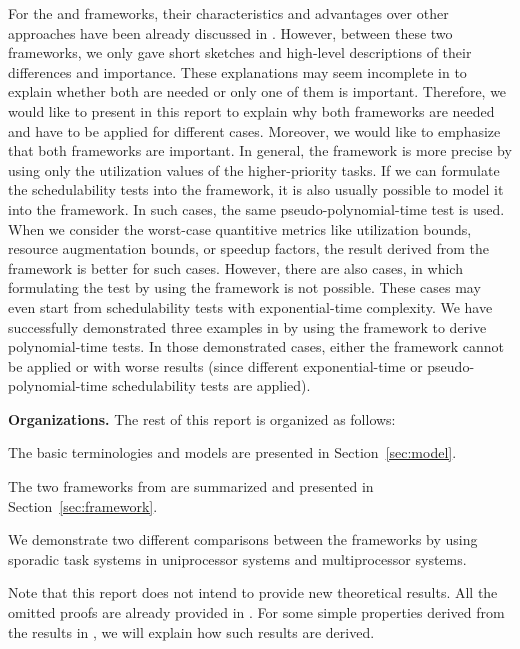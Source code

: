 \documentclass[10pt,conference]{IEEEtran}
\newcommand{\frameworkkq}[1]{}
\newcommand{\frameworkku}[1]{}
\begin{document}
For the \frameworkkq{} and \frameworkku{} frameworks, their
characteristics and advantages over other approaches have been already
discussed in
\cite{DBLP:journals/corr/abs-1501.07084,DBLP:conf/rtss/ChenHL15,DBLP:journals/corr/abs-kRTA,DBLP:conf/rtss/ChenHL16}. However,
between these two frameworks, we only gave short sketches and high-level descriptions of their
differences and importance. These explanations may seem
incomplete in \cite{DBLP:journals/corr/abs-1501.07084,DBLP:conf/rtss/ChenHL15,DBLP:journals/corr/abs-kRTA,DBLP:conf/rtss/ChenHL16} to explain whether both are needed or only one of them is important.  Therefore,
we would like to present in this report to explain why both frameworks
are needed and have to be applied for different cases.  Moreover, we
would like to emphasize that both frameworks are
important. In general, the \frameworkku{}
framework is more precise by using only the utilization values of the
higher-priority tasks. If we can formulate the schedulability tests
into the \frameworkku{} framework, it is also usually possible to
model it into the \frameworkkq{} framework. In such cases, the same
pseudo-polynomial-time test is used. When we consider the worst-case
quantitive metrics like utilization bounds, resource augmentation
bounds, or speedup factors, the result derived from the \frameworkku{}
framework is better for such cases. However, there are also cases, in
which formulating the test by using the \frameworkku{} framework is
not possible. These cases may even start from schedulability tests
with exponential-time complexity. We have successfully demonstrated
three examples in \cite{DBLP:journals/corr/abs-kRTA} by using the
\frameworkkq{} framework to derive polynomial-time tests. In those demonstrated cases, either
the \frameworkku{} framework cannot be applied or with worse results
(since different exponential-time or pseudo-polynomial-time schedulability tests are applied).

\noindent\textbf{Organizations.} The rest of this report is organized
as follows:
\begin{compactitem}
\item The basic terminologies and models are presented in
  Section~\ref{sec:model}. 
\item The two frameworks
  from\cite{DBLP:journals/corr/abs-1501.07084,DBLP:conf/rtss/ChenHL15,DBLP:journals/corr/abs-kRTA,DBLP:conf/rtss/ChenHL16}
  are summarized and presented in Section~\ref{sec:framework}.
\item We demonstrate two different comparisons between the frameworks
  by using sporadic task systems in uniprocessor systems and
  multiprocessor systems. 
\end{compactitem}
Note that this report does not intend to provide new theoretical
results. All the omitted proofs are already provided in
\cite{DBLP:journals/corr/abs-1501.07084,DBLP:conf/rtss/ChenHL15,DBLP:journals/corr/abs-kRTA,DBLP:conf/rtss/ChenHL16}. For
some simple properties derived from the results in
\cite{DBLP:journals/corr/abs-1501.07084,DBLP:conf/rtss/ChenHL15,DBLP:journals/corr/abs-kRTA,DBLP:conf/rtss/ChenHL16},
we will explain how such results are derived.
\end{document}
